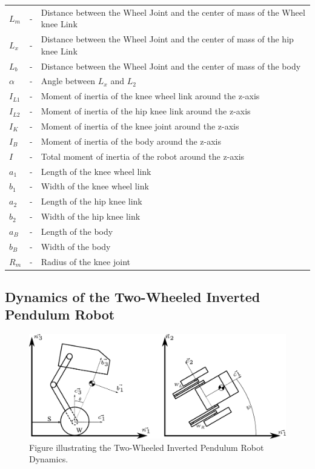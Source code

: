 \begin{table}[h!]
\begin{tabular}{lcl}
			$L_m$ & - & Distance between the Wheel Joint and the center of mass of the Wheel knee Link \\
			$L_x$ & - & Distance between the Wheel Joint and the center of mass of the hip knee Link \\
			$L_b$ & - & Distance between the Wheel Joint and the center of mass of the body \\
			$\alpha$ & - & Angle between $L_x$ and $L_2$ \\
			$I_{L1}$ & - & Moment of inertia of the knee wheel link around the z-axis \\
			$I_{L2}$ & - & Moment of inertia of the hip knee link around the z-axis \\
			$I_K$ & - & Moment of inertia of the knee joint around the z-axis \\
			$I_B$ & - & Moment of inertia of the body around the z-axis \\
			$I$ & - & Total moment of inertia of the robot around the z-axis \\
			$a_1$ & - & Length of the knee wheel link \\
			$b_1$ & - & Width of the knee wheel link \\
			$a_2$ & - & Length of the hip knee link \\
			$b_2$ & - & Width of the hip knee link \\
			$a_B$ & - & Length of the body \\
			$b_B$ & - & Width of the body \\
			$R_m$ & - & Radius of the knee joint \\
			\bottomrule
		\end{tabular}
	\end{table}
	\newpage
	\subsection{Dynamics of the Two-Wheeled Inverted Pendulum Robot}
	\begin{figure}[h]
		\centering
		\includegraphics[width=1\textwidth]{TWIPR dynamics}
		\caption[Two-Wheeled Inverted Pendulum Robot Dynamics]{Figure illustrating the Two-Wheeled Inverted Pendulum Robot Dynamics.}
		\label{fig:Two-Wheeled Inverted Pendulum Robot Dynamics}
	\end{figure}

